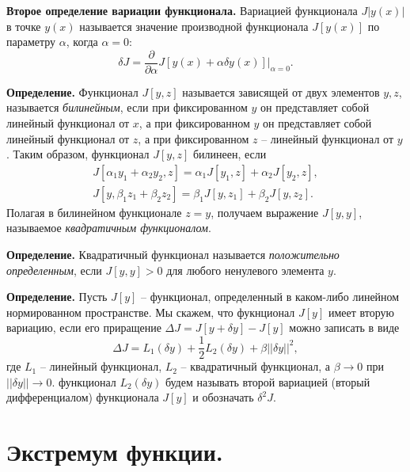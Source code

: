 \documentclass[9pt]{article}
\begin{document}
\par\textbf{Второе определение вариации функционала.} Вариацией функционала \(J|y(x)|\) в точке \(y(x)\) называется значение производной функционала \(J[y(x)]\) по параметру \(\alpha\), когда \(\alpha=0\):\[\delta J=\dfrac{\partial}{\partial\alpha}J[y(x)+\alpha\delta y(x)]|_{\alpha=0}.\]
\par\textbf{Определение.} Функционал \(J[y,z]\) называется зависящей от двух элементов \(y,z\), называется \textit{билинейным}, если при фиксированном \(y\) он представляет собой линейный функционал от \(x\), а при фиксированном \(y\) он представляет собой линейный функционал от \(z\), а при фиксированном \(z\) -- линейный функционал от \(y\). Таким образом, функционал \(J[y,z]\) билинеен, если
\begin{align*}
    J[\alpha_1y_1+\alpha_2y_2,z]=\alpha_1J[y_1,z]+\alpha_2J[y_2,z],\\ J[y,\beta_1z_1+\beta_2z_2]=\beta_1J[y,z_1]+\beta_2J[y,z_2].
\end{align*}
Полагая в билинейном функционале \(z=y\), получаем выражение \(J[y,y]\), называемое \textit{квадратичным функционалом}.
\par\textbf{Определение.} Квадратичный функционал называется \textit{положительно определенным}, если \(J[y,y]>0\) для любого ненулевого элемента \(y\). 
\par\textbf{Определение.} Пусть \(J[y]\) -- функционал, определенный в каком-либо линейном нормированном пространстве. Мы скажем, что фукнционал \(J[y]\) имеет вторую вариацию, если его приращение \(\Delta J=J[y+\delta y]-J[y]\) можно записать в виде\[\Delta J=L_1(\delta y)+\dfrac{1}{2}L_2(\delta y)+\beta||\delta y||^2,\] где \(L_1\) -- линейный функционал, \(L_2\) -- квадратичный функционал, а \(\beta\to0\) при \(||\delta y||\to0\).
 функционал \(L_2(\delta y)\) будем называть второй вариацией (вторый дифференциалом) функционала \(J[y]\) и обозначать \(\delta^2J\).

\section{Экстремум функции.}
\end{document}
